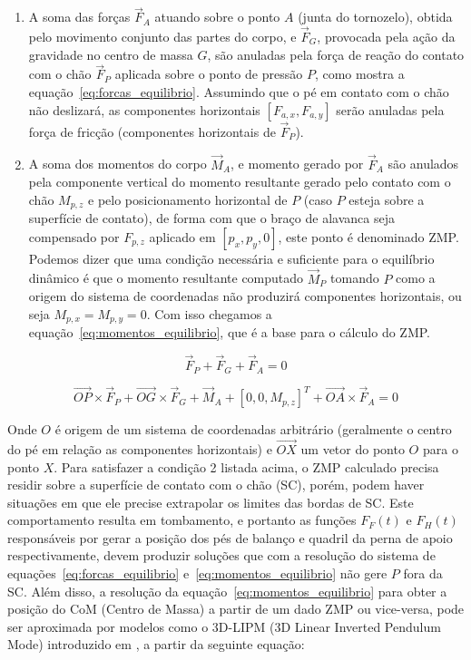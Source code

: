\begin{enumerate}
    \item A soma das forças $\vec{F}_A$ atuando sobre o ponto $A$ (junta do tornozelo), obtida pelo movimento conjunto das partes do corpo, e $\vec{F}_G$, provocada pela ação da gravidade no centro de massa $G$, são anuladas pela força de reação do contato com o chão $\vec{F}_P$ aplicada sobre o ponto de pressão $P$, como mostra a equação~\ref{eq:forcas_equilibrio}. Assumindo que o pé em contato com o chão não deslizará, as componentes horizontais $[F_{a,x}, F_{a,y}]$ serão anuladas pela força de fricção (componentes horizontais de $\vec{F}_P$).
    \item A soma dos momentos do corpo $\vec{M}_A$, e momento gerado por $\vec{F}_A$ são anulados pela componente vertical do momento resultante gerado pelo contato com o chão $M_{p,z}$ e pelo posicionamento horizontal de $P$ (caso $P$ esteja sobre a superfície de contato), de forma com que o braço de alavanca seja compensado por $F_{p,z}$ aplicado em $[p_x, p_y, 0]$, este ponto é denominado ZMP. Podemos dizer que uma condição necessária e suficiente para o equilíbrio dinâmico é que o momento resultante computado $\vec{M}_P$ tomando $P$ como a origem do sistema de coordenadas não produzirá componentes horizontais, ou seja $M_{p,x} = M_{p,y} = 0$. Com isso chegamos a equação~\ref{eq:momentos_equilibrio}, que é a base para o cálculo do ZMP.
\end{enumerate}

\begin{equation}
    \label{eq:forcas_equilibrio}
    \vec{F}_P + \vec{F}_G + \vec{F}_A = 0
\end{equation}

\begin{equation}
    \label{eq:momentos_equilibrio}
    \overrightarrow{OP} \times \vec{F}_P + \overrightarrow{OG} \times \vec{F}_G + \vec{M}_A + [0,0,M_{p,z}]^T + \overrightarrow{OA} \times \vec{F}_A = 0
\end{equation}

Onde $O$ é origem de um sistema de coordenadas arbitrário (geralmente o centro do pé em relação as componentes horizontais) e $\overrightarrow{OX}$ um vetor do ponto $O$ para o ponto $X$. Para satisfazer a condição 2 listada acima, o ZMP calculado precisa residir sobre a superfície de contato com o chão (SC), porém, podem haver situações em que ele precise extrapolar os limites das bordas de SC. Este comportamento resulta em tombamento, e portanto as funções $F_F(t)$ e $F_H(t)$ responsáveis por gerar a posição dos pés de balanço e quadril da perna de apoio respectivamente, devem produzir soluções que com a resolução do sistema de equações~\ref{eq:forcas_equilibrio} e~\ref{eq:momentos_equilibrio} não gere $P$ fora da SC. Além disso, a resolução da equação~\ref{eq:momentos_equilibrio} para obter a posição do CoM (Centro de Massa) a partir de um dado ZMP ou vice-versa, pode ser aproximada por modelos como o 3D-LIPM (3D Linear Inverted Pendulum Mode) introduzido em \cite{Kajita2001}, a partir da seguinte equação:

